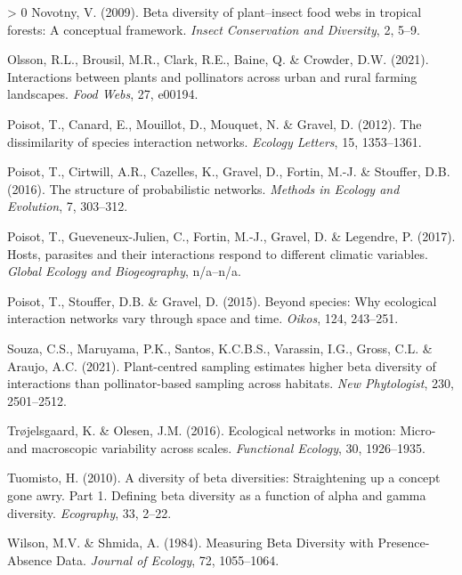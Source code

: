 \documentclass[11pt]{article}
\newlength{\cslhangindent}
\newenvironment{CSLReferences}[3] %
 {%
  \setlength{\parindent}{0pt}
  \ifodd #1 \everypar{\setlength{\hangindent}{\cslhangindent}}\ignorespaces\fi
  \ifnum #2 > 0
  \setlength{\parskip}{#2\baselineskip}
  \fi
 }%
 {}
\begin{document}
\begin{CSLReferences}{1}{0}
\leavevmode\hypertarget{ref-Novotny2009BetDiv}{}%
Novotny, V. (2009). Beta diversity of plant--insect food webs in
tropical forests: A conceptual framework. \emph{Insect Conservation and
Diversity}, 2, 5--9.

\leavevmode\hypertarget{ref-Olsson2021IntPla}{}%
Olsson, R.L., Brousil, M.R., Clark, R.E., Baine, Q. \& Crowder, D.W.
(2021). Interactions between plants and pollinators across urban and
rural farming landscapes. \emph{Food Webs}, 27, e00194.

\leavevmode\hypertarget{ref-Poisot2012DisSpe}{}%
Poisot, T., Canard, E., Mouillot, D., Mouquet, N. \& Gravel, D. (2012).
The dissimilarity of species interaction networks. \emph{Ecology
Letters}, 15, 1353--1361.

\leavevmode\hypertarget{ref-Poisot2016StrPro}{}%
Poisot, T., Cirtwill, A.R., Cazelles, K., Gravel, D., Fortin, M.-J. \&
Stouffer, D.B. (2016). The structure of probabilistic networks.
\emph{Methods in Ecology and Evolution}, 7, 303--312.

\leavevmode\hypertarget{ref-Poisot2017HosPar}{}%
Poisot, T., Gueveneux-Julien, C., Fortin, M.-J., Gravel, D. \& Legendre,
P. (2017). Hosts, parasites and their interactions respond to different
climatic variables. \emph{Global Ecology and Biogeography}, n/a--n/a.

\leavevmode\hypertarget{ref-Poisot2015SpeWhy}{}%
Poisot, T., Stouffer, D.B. \& Gravel, D. (2015). Beyond species: Why
ecological interaction networks vary through space and time.
\emph{Oikos}, 124, 243--251.

\leavevmode\hypertarget{ref-Souza2021PlaSam}{}%
Souza, C.S., Maruyama, P.K., Santos, K.C.B.S., Varassin, I.G., Gross,
C.L. \& Araujo, A.C. (2021). Plant-centred sampling estimates higher
beta diversity of interactions than pollinator-based sampling across
habitats. \emph{New Phytologist}, 230, 2501--2512.

\leavevmode\hypertarget{ref-Trojelsgaard2016EcoNet}{}%
Trøjelsgaard, K. \& Olesen, J.M. (2016). Ecological networks in motion:
Micro- and macroscopic variability across scales. \emph{Functional
Ecology}, 30, 1926--1935.

\leavevmode\hypertarget{ref-Tuomisto2010DivBet}{}%
Tuomisto, H. (2010). A diversity of beta diversities: Straightening up a
concept gone awry. Part 1. Defining beta diversity as a function of
alpha and gamma diversity. \emph{Ecography}, 33, 2--22.

\leavevmode\hypertarget{ref-Wilson1984MeaBet}{}%
Wilson, M.V. \& Shmida, A. (1984). Measuring Beta Diversity with
Presence-Absence Data. \emph{Journal of Ecology}, 72, 1055--1064.

\end{CSLReferences}
\end{document}
